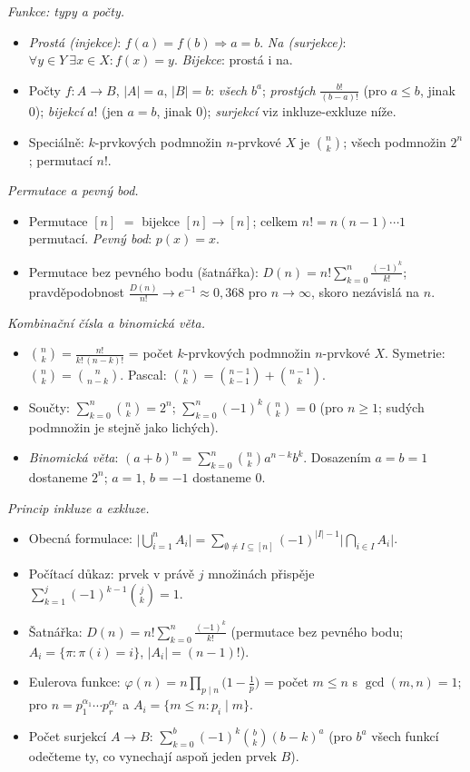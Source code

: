 \documentclass[11pt,a4paper]{article}
\begin{document}
\begin{poznamka}
\smallskip
\emph{Funkce: typy a počty.}
\begin{itemize}
  \item \emph{Prostá (injekce)}: $f(a)=f(b)\Rightarrow a=b$. \emph{Na (surjekce)}: $\forall y\in Y\ \exists x\in X:f(x)=y$. \emph{Bijekce}: prostá i na.
  \item Počty $f\colon A\to B$, $|A|=a$, $|B|=b$: \emph{všech} $b^a$; \emph{prostých} $\frac{b!}{(b-a)!}$ (pro $a\le b$, jinak $0$); \emph{bijekcí} $a!$ (jen $a=b$, jinak $0$); \emph{surjekcí} viz inkluze-exkluze níže.
  \item Speciálně: $k$-prvkových podmnožin $n$-prvkové $X$ je $\binom{n}{k}$; všech podmnožin $2^n$; permutací $n!$.
\end{itemize}

\smallskip
\emph{Permutace a pevný bod.}
\begin{itemize}
  \item Permutace $[n]$ $=$ bijekce $[n]\to[n]$; celkem $n!=n(n-1)\cdots1$ permutací. \emph{Pevný bod}: $p(x)=x$.
  \item Permutace bez pevného bodu (šatnářka): $D(n)=n!\sum_{k=0}^{n}\frac{(-1)^k}{k!}$; pravděpodobnost $\frac{D(n)}{n!}\to e^{-1}\approx0{,}368$ pro $n\to\infty$, skoro nezávislá na $n$.
\end{itemize}

\smallskip
\emph{Kombinační čísla a binomická věta.}
\begin{itemize}
  \item $\binom{n}{k}=\frac{n!}{k!\,(n-k)!}$ = počet $k$-prvkových podmnožin $n$-prvkové $X$. Symetrie: $\binom{n}{k}=\binom{n}{n-k}$. Pascal: $\binom{n}{k}=\binom{n-1}{k-1}+\binom{n-1}{k}$.
  \item Součty: $\sum_{k=0}^{n}\binom{n}{k}=2^n$; $\sum_{k=0}^{n}(-1)^k\binom{n}{k}=0$ (pro $n\ge1$; sudých podmnožin je stejně jako lichých).
  \item \emph{Binomická věta}: $(a+b)^n=\sum_{k=0}^{n}\binom{n}{k}a^{n-k}b^k$. Dosazením $a{=}b{=}1$ dostaneme $2^n$; $a{=}1$, $b{=}{-1}$ dostaneme $0$.
\end{itemize}

\smallskip
\emph{Princip inkluze a exkluze.}
\begin{itemize}
  \item Obecná formulace: $\bigl|\bigcup_{i=1}^{n}A_i\bigr|=\sum_{\emptyset\ne I\subseteq[n]}(-1)^{|I|-1}\bigl|\bigcap_{i\in I}A_i\bigr|$.
  \item Počítací důkaz: prvek v právě $j$ množinách přispěje $\sum_{k=1}^{j}(-1)^{k-1}\binom{j}{k}=1$.
  \item Šatnářka: $D(n)=n!\sum_{k=0}^{n}\frac{(-1)^k}{k!}$ (permutace bez pevného bodu; $A_i=\{\pi:\pi(i)=i\}$, $|A_i|=(n-1)!$).
  \item Eulerova funkce: $\varphi(n)=n\prod_{p\mid n}\bigl(1-\tfrac{1}{p}\bigr)$ = počet $m\le n$ s $\gcd(m,n)=1$; pro $n=p_1^{\alpha_1}\cdots p_r^{\alpha_r}$ a $A_i=\{m\le n:p_i\mid m\}$.
  \item Počet surjekcí $A\to B$: $\sum_{k=0}^{b}(-1)^k\binom{b}{k}(b-k)^a$ (pro $b^a$ všech funkcí odečteme ty, co vynechají aspoň jeden prvek $B$).
\end{itemize}


\end{poznamka}
\end{document}
